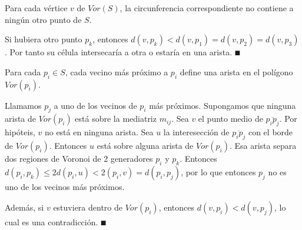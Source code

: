 \documentclass[twoside]{report}
\begin{document}
\begin{teorema} Para cada vértice $v$ de $Vor(S)$, la
circunferencia correspondiente no contiene a ningún otro punto de
$S$.
\end{teorema}
\begin{dem}
Si hubiera otro punto $p_k$, entonces $d(v,p_k)<d(v,p_1)=d(v,p_2)=d(v,p_3)$. Por tanto su célula intersecaría a otra o estaría en una arista. $\QED$
\end{dem}

\begin{teorema} Para cada $p_i \in S$, cada vecino más
próximo a $p_i$ define una arista en el polígono $Vor(p_i)$.
\end{teorema}
\begin{dem} 

Llamamos $p_j$ a uno de los vecinos de $p_i$ más próximos. Supongamos que ninguna arista de $Vor(p_i)$ está sobre la mediatriz $m_{ij}$. Sea $v$ el punto medio de $\overline{p_ip_j}$. Por hipóteis, $v$ no está en ninguna arista. Sea $u$ la interesección de $\overline{p_ip_j}$ con el borde de $Vor(p_i)$. Entonces $u$ está sobre alguna arista de $Vor(p_i)$. Esa arista separa dos regiones de Voronoi de 2 generadores $p_i$ y $p_k$. Entonces $d(p_i,p_k)\leq 2d(p_i,u)<2(p_i,v)=d(p_i,p_j)$, por lo que entonces $p_j$ no es uno de los vecinos más próximos. 


Además, si $v$ estuviera dentro de $Vor(p_i)$, entonces $d(v,p_i)<d(v,p_j)$, lo cual es una contradicción. $\QED$
\end{dem}
\end{document}
